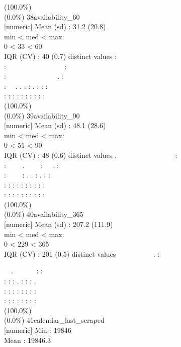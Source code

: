 \documentclass[
  journal,
]{IEEEtran}%
\begin{document}
(100.0\%) \\
(0.0\%) \textbar{} \textbar{} 38\textbar availability\_60\\
{[}numeric{]} \textbar Mean (sd) : 31.2 (20.8)\\
min \textless{} med \textless{} max:\\
0 \textless{} 33 \textless{} 60\\
IQR (CV) : 40 (0.7)  distinct values \textbar{} \textbar:\\
: ~~~~~~~~~~~~~~~~:\\
: ~~~~~~~~~~~~~~. :\\
: ~~. . : : . : : :\\
: : : : : : : : : : \\
(100.0\%) \\
(0.0\%) \textbar{} \textbar{} 39\textbar availability\_90\\
{[}numeric{]} \textbar Mean (sd) : 48.1 (28.6)\\
min \textless{} med \textless{} max:\\
0 \textless{} 51 \textless{} 90\\
IQR (CV) : 48 (0.6)  distinct values \textbar{} \textbar.
~~~~~~~~~~~~~~~~:\\
: ~~~~. ~~~~: ~~. :\\
: ~~~~: . . : . : :\\
: : : : : : : : : :\\
: : : : : : : : : : \\
(100.0\%) \\
(0.0\%) \textbar{} \textbar{} 40\textbar availability\_365\\
{[}numeric{]} \textbar Mean (sd) : 207.2 (111.9)\\
min \textless{} med \textless{} max:\\
0 \textless{} 229 \textless{} 365\\
IQR (CV) : 201 (0.5)  distinct values \textbar{}
\textbar~~~~~~~~~~. :\\
\strut ~~. ~~~~~~: :\\
: : : . : : : .\\
: : : : : : : :\\
: : : : : : : : \\
(100.0\%) \\
(0.0\%) \textbar{} \textbar{} 41\textbar calendar\_last\_scraped\\
{[}numeric{]} \textbar Min : 19846\\
Mean : 19846.3\\
\end{document}
